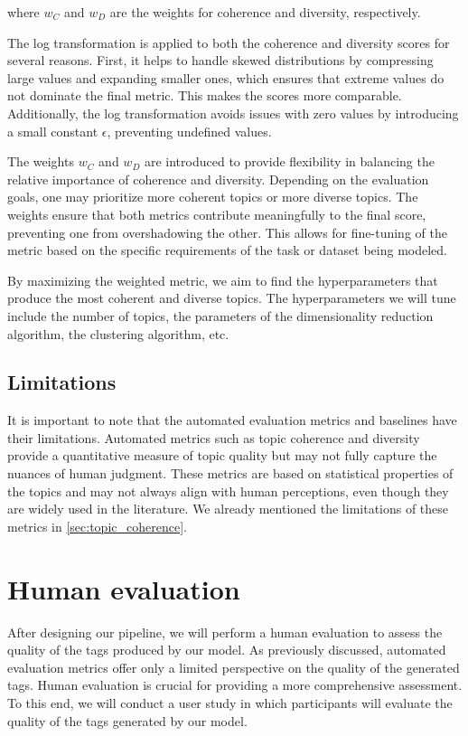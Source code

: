 where \( w_C \) and \( w_D \) are the weights for coherence and diversity, respectively.

The log transformation is applied to both the coherence and diversity scores for several reasons. First, it helps to handle skewed distributions by compressing large values and expanding smaller ones, which ensures that extreme values do not dominate the final metric. This makes the scores more comparable. Additionally, the log transformation avoids issues with zero values by introducing a small constant \( \epsilon \), preventing undefined values.

The weights \( w_C \) and \( w_D \) are introduced to provide flexibility in balancing the relative importance of coherence and diversity. Depending on the evaluation goals, one may prioritize more coherent topics or more diverse topics. The weights ensure that both metrics contribute meaningfully to the final score, preventing one from overshadowing the other. This allows for fine-tuning of the metric based on the specific requirements of the task or dataset being modeled.

By maximizing the weighted metric, we aim to find the hyperparameters that produce the most coherent and diverse topics. The hyperparameters we will tune include the number of topics, the parameters of the dimensionality reduction algorithm, the clustering algorithm, etc.

\subsection{Limitations}
It is important to note that the automated evaluation metrics and baselines have their limitations. Automated metrics such as topic coherence and diversity provide a quantitative measure of topic quality but may not fully capture the nuances of human judgment. These metrics are based on statistical properties of the topics and may not always align with human perceptions, even though they are widely used in the literature. We already mentioned the limitations of these metrics in \cref{sec:topic_coherence}.

\section{Human evaluation}
\label{sec:human_evaluation}
After designing our pipeline, we will perform a human evaluation to assess the quality of the tags produced by our model. As previously discussed, automated evaluation metrics offer only a limited perspective on the quality of the generated tags. Human evaluation is crucial for providing a more comprehensive assessment. To this end, we will conduct a user study in which participants will evaluate the quality of the tags generated by our model.

